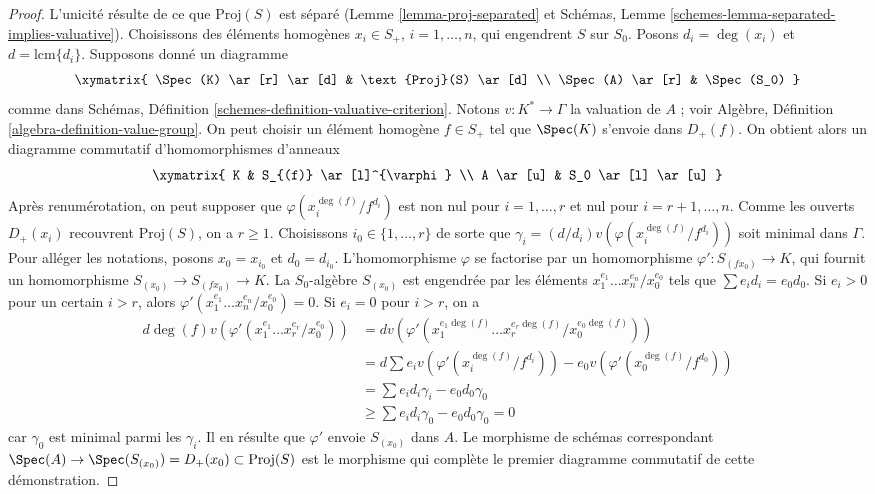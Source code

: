 \begin{proof}
L'unicité résulte de ce que $\text{Proj}(S)$ est séparé
(Lemme \ref{lemma-proj-separated} et Schémas,
Lemme \ref{schemes-lemma-separated-implies-valuative}).
Choisissons des éléments homogènes $x_i \in S_{+}$, $i = 1, \ldots, n$,
qui engendrent $S$ sur $S_0$. Posons $d_i = \deg(x_i)$ et
$d = \text{lcm}\{d_i\}$. Supposons donné un diagramme
$$
\xymatrix{
\Spec(K) \ar[r] \ar[d] & \text{Proj}(S) \ar[d] \\
\Spec(A) \ar[r] & \Spec(S_0)
}
$$
comme dans Schémas, Définition \ref{schemes-definition-valuative-criterion}.
Notons $v : K^* \to \Gamma$ la valuation de $A$ ; voir Algèbre,
Définition \ref{algebra-definition-value-group}. On peut choisir un élément
homogène $f \in S_{+}$ tel que $\Spec(K)$ s'envoie dans $D_{+}(f)$. On obtient
alors un diagramme commutatif d'homomorphismes d'anneaux
$$
\xymatrix{
K & S_{(f)} \ar[l]^{\varphi} \\
A \ar[u] & S_0 \ar[l] \ar[u]
}
$$
Après renumérotation, on peut supposer que
$\varphi(x_i^{\deg(f)}/f^{d_i})$ est non nul pour $i = 1, \ldots, r$ et nul
pour $i = r + 1, \ldots, n$. Comme les ouverts $D_{+}(x_i)$ recouvrent
$\text{Proj}(S)$, on a $r \geq 1$. Choisissons
$i_0 \in \{1, \ldots, r\}$ de sorte que
$\gamma_i = (d/d_i)v(\varphi(x_i^{\deg(f)}/f^{d_i}))$ soit minimal dans
$\Gamma$. Pour alléger les notations, posons $x_0 = x_{i_0}$ et
$d_0 = d_{i_0}$. L'homomorphisme $\varphi$ se factorise par un homomorphisme
$\varphi' : S_{(fx_0)} \to K$, qui fournit un homomorphisme
$S_{(x_0)} \to S_{(fx_0)} \to K$.
La $S_0$-algèbre $S_{(x_0)}$ est engendrée par les éléments
$x_1^{e_1} \ldots x_n^{e_n}/x_0^{e_0}$ tels que
$\sum e_i d_i = e_0 d_0$. Si $e_i > 0$ pour un certain $i > r$, alors
$\varphi'(x_1^{e_1} \ldots x_n^{e_n}/x_0^{e_0}) = 0$.
Si $e_i = 0$ pour $i > r$, on a
\begin{align*}
d \deg(f) v(\varphi'(x_1^{e_1} \ldots x_r^{e_r}/x_0^{e_0}))
& =
d v(\varphi'(x_1^{e_1 \deg(f)} \ldots x_r^{e_r \deg(f)}/x_0^{e_0 \deg(f)})) \\
& =
d \sum e_i v(\varphi'(x_i^{\deg(f)}/f^{d_i}))
- e_0 v(\varphi'(x_0^{\deg(f)}/f^{d_0})) \\
& =
\sum e_i d_i \gamma_i - e_0 d_0 \gamma_0 \\
& \geq
\sum e_i d_i \gamma_0 - e_0 d_0 \gamma_0 = 0
\end{align*}
car $\gamma_0$ est minimal parmi les $\gamma_i$. Il en résulte que
$\varphi'$ envoie $S_{(x_0)}$ dans $A$. Le morphisme de schémas correspondant
$\Spec(A) \to \Spec(S_{(x_0)}) = D_{+}(x_0)
\subset \text{Proj}(S)$ est le morphisme qui complète le premier diagramme
commutatif de cette démonstration.
\end{proof}

